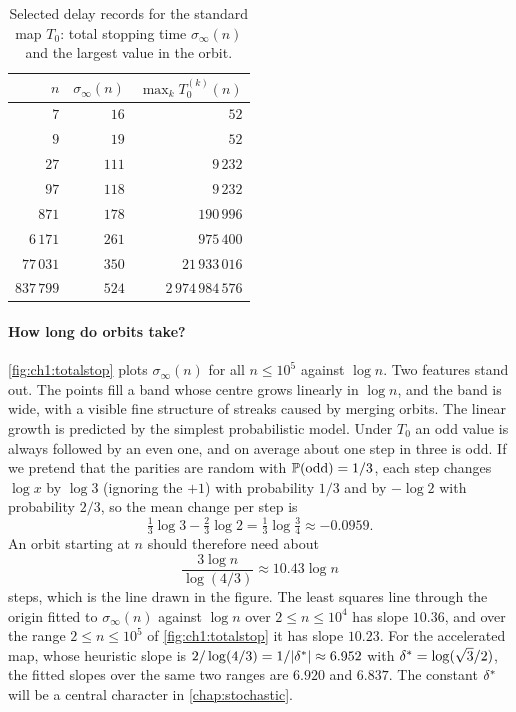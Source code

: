 \begin{table}[t]
\centering
\caption{Selected delay records for the standard map $T_0$: total stopping
time $\sigma_\infty(n)$ and the largest value in the orbit.}
\label{tab:ch1:records}
\begin{tabular}{@{}rrr@{}}
\toprule
$n$ & $\sigma_\infty(n)$ & $\max_k T_0^{(k)}(n)$ \\
\midrule
$7$ & $16$ & $52$ \\
$9$ & $19$ & $52$ \\
$27$ & $111$ & $9\,232$ \\
$97$ & $118$ & $9\,232$ \\
$871$ & $178$ & $190\,996$ \\
$6\,171$ & $261$ & $975\,400$ \\
$77\,031$ & $350$ & $21\,933\,016$ \\
$837\,799$ & $524$ & $2\,974\,984\,576$ \\
\bottomrule
\end{tabular}
\end{table}

\paragraph{How long do orbits take?} \cref{fig:ch1:totalstop} plots
$\sigma_\infty(n)$ for all $n\leq10^5$ against $\log n$. Two features stand
out. The points fill a band whose centre grows linearly in $\log n$, and the
band is wide, with a visible fine structure of streaks caused by merging
orbits. The linear growth is predicted by the simplest probabilistic model.
Under $T_0$ an odd value is always followed by an even one, and on average
about one step in three is odd. If we pretend that the parities are random
with $\mathbb{P}(\text{odd})=1/3$, each step changes $\log x$ by $\log3$ (ignoring
the $+1$) with probability $1/3$ and by $-\log2$ with probability $2/3$, so the
mean change per step is
\[
  \tfrac13\log3-\tfrac23\log2=\tfrac13\log\tfrac34\approx-0.0959.
\]
An orbit starting at $n$ should therefore need about
\[
  \frac{3\log n}{\log(4/3)}\approx10.43\log n
\]
steps, which is the line drawn in the figure.
The least squares line through the origin fitted to $\sigma_\infty(n)$ against $\log n$ over $2\leq n\leq10^4$ has slope $10.36$, and over the range $2\leq n\leq10^5$ of \cref{fig:ch1:totalstop} it has slope $10.23$.
For the accelerated map, whose heuristic slope is $2/\log(4/3)=1/|\delta^{*}|\approx6.952$ with $\delta^{*}=\log(\sqrt3/2)$, the fitted slopes over the same two ranges are $6.920$ and $6.837$.
The constant
$\delta^{*}$ will be a central character in \cref{chap:stochastic}.

